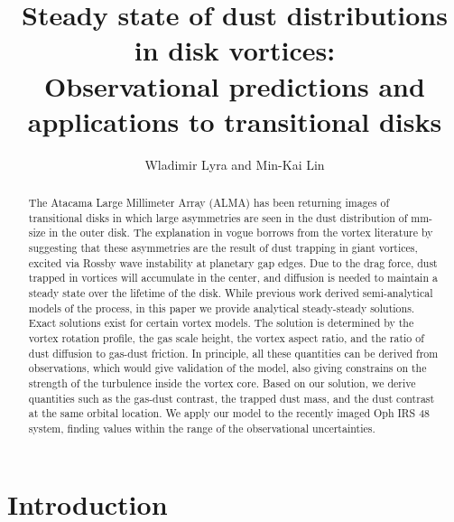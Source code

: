 \documentclass[apj]{emulateapj}
\begin{document}
\title{Steady state of dust distributions in disk vortices:\\
Observational predictions and applications to transitional disks}
\author{Wladimir Lyra and Min-Kai Lin}

\begin{abstract}
The Atacama Large Millimeter Array (ALMA) has been  returning images of transitional disks in which large asymmetries are seen in the dust distribution of 
mm-size in the outer disk. The explanation in vogue borrows from the vortex literature by suggesting 
that these asymmetries are the result of dust trapping in giant vortices, excited via Rossby wave instability 
at planetary gap edges. Due to the drag force, dust trapped in vortices will accumulate 
in the center, and diffusion is needed to maintain a steady state over the lifetime of the disk. While previous work 
derived semi-analytical models of the process, in this paper we
provide analytical steady-steady solutions. Exact solutions exist for certain vortex models.
The solution is determined by the vortex rotation profile, the gas scale height, the 
vortex aspect ratio, and the ratio of dust diffusion to gas-dust friction. In principle, all these quantities can be derived
from observations, which would give validation of the model, also giving constrains on the strength of the turbulence 
inside the vortex core. Based on our solution, we derive quantities such as the gas-dust contrast, the trapped dust mass,
and the dust contrast at the same orbital location. We apply our model to the recently imaged Oph IRS 48 system, finding 
values within the range of the observational uncertainties.
\end{abstract}

\section{Introduction}
\label{sect:introduction}
\end{document}
